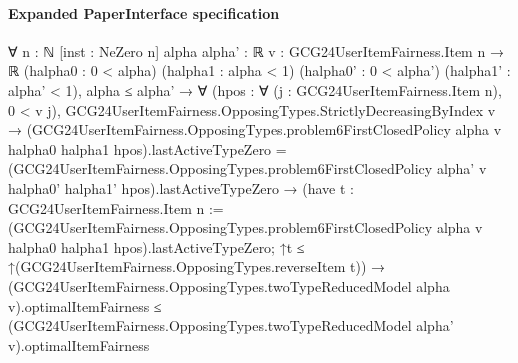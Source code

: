 \documentclass[10pt]{article}
\begin{document}
\paragraph{Expanded PaperInterface specification}
\begin{ReviewVerbatim}
∀ {n : ℕ} [inst : NeZero n] {alpha alpha' : ℝ} {v : GCG24UserItemFairness.Item n → ℝ} (halpha0 : 0 < alpha)
  (halpha1 : alpha < 1) (halpha0' : 0 < alpha') (halpha1' : alpha' < 1),
  alpha ≤ alpha' →
    ∀ (hpos : ∀ (j : GCG24UserItemFairness.Item n), 0 < v j),
      GCG24UserItemFairness.OpposingTypes.StrictlyDecreasingByIndex v →
        (GCG24UserItemFairness.OpposingTypes.problem6FirstClosedPolicy alpha v halpha0 halpha1
                hpos).lastActiveTypeZero =
            (GCG24UserItemFairness.OpposingTypes.problem6FirstClosedPolicy alpha' v halpha0' halpha1'
                hpos).lastActiveTypeZero →
          (have t : GCG24UserItemFairness.Item n :=
              (GCG24UserItemFairness.OpposingTypes.problem6FirstClosedPolicy alpha v halpha0 halpha1
                  hpos).lastActiveTypeZero;
            ↑t ≤ ↑(GCG24UserItemFairness.OpposingTypes.reverseItem t)) →
            (GCG24UserItemFairness.OpposingTypes.twoTypeReducedModel alpha v).optimalItemFairness ≤
              (GCG24UserItemFairness.OpposingTypes.twoTypeReducedModel alpha' v).optimalItemFairness
\end{ReviewVerbatim}
\end{document}
